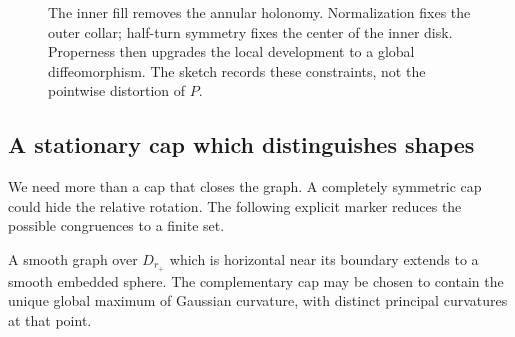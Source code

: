 \begin{figure}[htbp]
\centering
{}
\caption{The inner fill removes the annular holonomy. Normalization
fixes the outer collar; half-turn symmetry fixes the center of the
inner disk. Properness then upgrades the local development to a
global diffeomorphism. The sketch records these constraints, not
the pointwise distortion of $P$.}
\label{fig:development}
\end{figure}

\subsection{A stationary cap which distinguishes shapes}

We need more than a cap that closes the graph. A completely symmetric
cap could hide the relative rotation. The following explicit marker
reduces the possible congruences to a finite set.

\begin{lemma}\label{lem:fixed-cap}
A smooth graph over $D_{r_+}$ which is horizontal near its boundary
extends to a smooth embedded sphere. The complementary cap may be
chosen to contain the unique global maximum of Gaussian curvature,
with distinct principal curvatures at that point.
\end{lemma}

